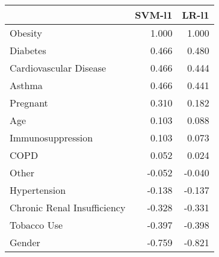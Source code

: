 \begin{tabular}{lrr}
\toprule
{} &  SVM-l1 &  LR-l1 \\
\midrule
Obesity                     &   1.000 &  1.000 \\
Diabetes                    &   0.466 &  0.480 \\
Cardiovascular Disease      &   0.466 &  0.444 \\
Asthma                      &   0.466 &  0.441 \\
Pregnant                    &   0.310 &  0.182 \\
Age                         &   0.103 &  0.088 \\
Immunosuppression           &   0.103 &  0.073 \\
COPD                        &   0.052 &  0.024 \\
Other                       &  -0.052 & -0.040 \\
Hypertension                &  -0.138 & -0.137 \\
Chronic Renal Insufficiency &  -0.328 & -0.331 \\
Tobacco Use                 &  -0.397 & -0.398 \\
Gender                      &  -0.759 & -0.821 \\
\bottomrule
\end{tabular}
